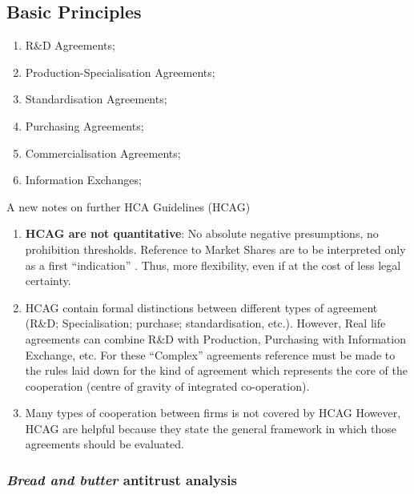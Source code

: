     \subsection{Basic Principles}

        \begin{enumerate}
            \item R\&D Agreements;
            \item Production-Specialisation Agreements;
            \item Standardisation Agreements;
            \item Purchasing Agreements;
            \item Commercialisation Agreements;
            \item Information Exchanges;
        \end{enumerate}


    A new notes on further HCA Guidelines (HCAG)
    \begin{enumerate}
        \item \textbf{HCAG are not quantitative}: No absolute negative presumptions, no prohibition thresholds. Reference to Market Shares are to be interpreted only as a first “indication” . Thus, more flexibility, even if at the cost of less legal certainty.
        \item HCAG contain formal distinctions between different types of agreement (R\&D; Specialisation; purchase; standardisation, etc.). However, Real life agreements can combine R\&D with Production, Purchasing with Information Exchange, etc. For these “Complex” agreements reference must be made to the rules laid down for the kind of agreement which represents the core of the cooperation (centre of gravity of integrated co-operation).
        \item Many types of cooperation between firms is not covered by HCAG However, HCAG are helpful because they state the general framework in which those agreements should be evaluated.
    \end{enumerate}

        \subsubsection{\textit{Bread and butter} antitrust analysis}

